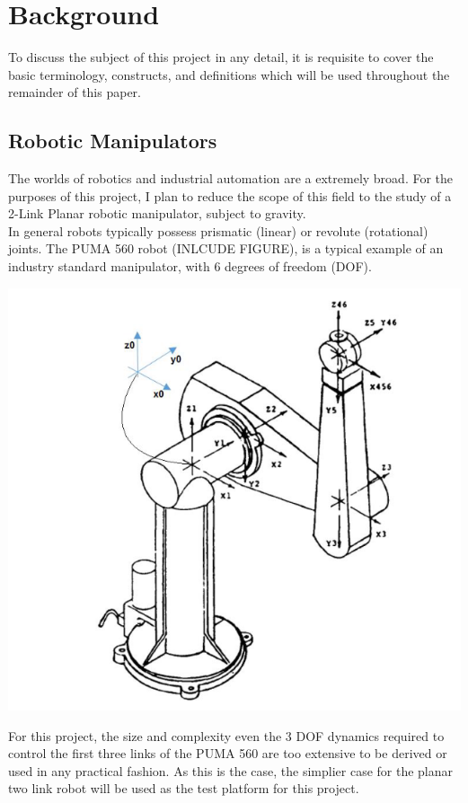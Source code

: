 \documentclass[journal]{IEEEtran}
\begin{document}
\section{Background}
To discuss the subject of this project in any detail, it is requisite to cover the basic terminology, constructs, and definitions which will be used throughout the remainder of this paper.

\subsection{Robotic Manipulators}

The worlds of robotics and industrial automation are a extremely broad. For the purposes of this project, I plan to reduce the scope of this field to the study of a 2-Link Planar robotic manipulator, subject to gravity. \\

In general robots typically possess prismatic (linear) or revolute (rotational) joints. The PUMA 560 robot (INLCUDE FIGURE), is a typical example of an industry standard manipulator, with 6 degrees of freedom (DOF).

\includegraphics[scale=.5]{./images/puma}

For this project, the size and complexity even the 3 DOF  dynamics required to control the first three links of the PUMA 560 are too extensive to be derived or used in any practical fashion. As this is the case, the simplier case for the planar two link robot will be used as the test platform for this project.
\end{document}
